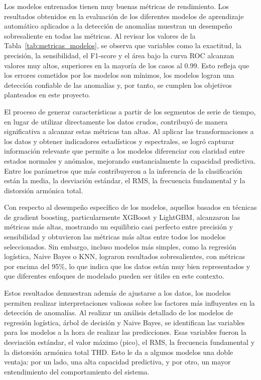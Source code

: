 \documentclass[11pt,a4paper,spanish]{book}
\numberwithin{equation}{chapter}
\numberwithin{figure}{chapter}
\begin{document}
Los modelos entrenados tienen muy buenas métricas de rendimiento. 
Los resultados obtenidos en la evaluación de los diferentes modelos de aprendizaje 
automático aplicados a la detección de anomalías muestran un desempeño sobresaliente 
en todas las métricas. 
Al revisar los valores de la Tabla~\ref{tab:metricas_modelos}, se observa que variables como la exactitud, 
la precisión, la sensibilidad, el F1-score y el área bajo la curva ROC alcanzan 
valores muy altos, superiores en la mayoría de los casos al 0.99. Esto refleja que los 
errores cometidos por los modelos son mínimos, los modelos logran una detección 
confiable de las anomalías y, por tanto, se cumplen los objetivos planteados en 
este proyecto.


El proceso de generar características a partir de los segmentos de serie de tiempo, 
en lugar de utilizar directamente los datos crudos, contribuyó de manera significativa 
a alcanzar estas métricas tan altas. Al aplicar las transformaciones a los datos y 
obtener indicadores estadísticos y espectrales, se logró capturar información relevante 
que permite a los modelos diferenciar con claridad entre estados normales y anómalos, 
mejorando sustancialmente la capacidad predictiva. Entre los parámetros que más 
contribuyeron a la inferencia de la clasificación están la media, la desviación estándar, 
el RMS, la frecuencia fundamental y la distorsión armónica total.


Con respecto al desempeño específico de los modelos, aquellos basados en técnicas de 
gradient boosting, particularmente XGBoost y LightGBM, alcanzaron las métricas más altas, 
mostrando un equilibrio casi perfecto entre precisión y sensibilidad y obtuvieron las 
métricas más altas entre todos los modelos seleccionados. Sin embargo, incluso modelos 
más simples, como la regresión logística, Naive Bayes o KNN, lograron resultados 
sobresalientes, con métricas por encima del 95\%, lo que indica que los datos están muy 
bien representados y que diferentes enfoques de modelado pueden ser útiles en este 
contexto.


Estos resultados demuestran además de ajustarse a los datos, los modelos permiten 
realizar interpretaciones valiosas sobre los factores más influyentes en la detección 
de anomalías. 
Al realizar un análisis detallado de los modelos de regresión logística, árbol de 
decisión y Naive Bayes, se identifican las variables para los modelos a la hora de 
realizar las predicciones. Esas variables fueron la desviación estándar, el valor 
máximo (pico), el RMS, la frecuencia fundamental y la distorsión armónica total THD. 
Esto le da a algunos modelos una doble ventaja: por un lado, una alta capacidad 
predictiva, y por otro, un mayor entendimiento del comportamiento del sistema.
\end{document}
